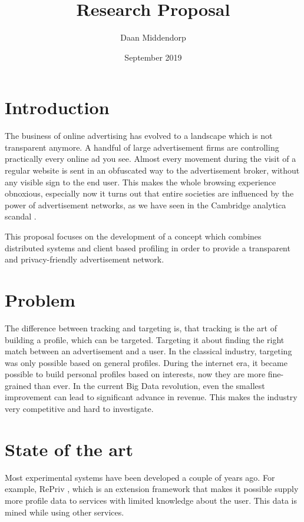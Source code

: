 \documentclass[]{article}
\title{Research Proposal}
\author{Daan Middendorp}
\date{September 2019}
\begin{document}
\maketitle

\section{Introduction}

The business of online advertising has evolved to a landscape which is not transparent anymore. A handful of large advertisement firms are controlling practically every online ad you see. Almost every movement during the visit of a regular website is sent in an obfuscated way to the advertisement broker, without any visible sign to the end user. This makes the whole browsing experience obnoxious, especially now it turns out that entire societies are influenced by the power of advertisement networks, as we have seen in the Cambridge analytica scandal .

This proposal focuses on the development of a concept which combines distributed systems and client based profiling in order to provide a transparent and privacy-friendly advertisement network. 

\section{Problem}

The difference between tracking and targeting is, that tracking is the art of building a profile, which can be targeted. Targeting it about finding the right match between an advertisement and a user. In the classical industry, targeting was only possible based on general profiles. During the internet era, it became possible to build personal profiles based on interests, now they are more fine-grained than ever. In the current Big Data revolution, even the smallest improvement can lead to significant advance in revenue. This makes the industry very competitive and hard to investigate.

\section{State of the art}

Most experimental systems have been developed a couple of years ago. For example, RePriv , which is an extension framework that makes it possible supply more profile data to services with limited knowledge about the user. This data is mined while using other services. 
\end{document}
